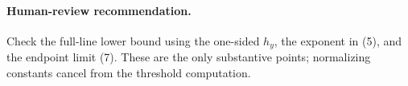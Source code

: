 \documentclass[10pt]{article}
\begin{document}
\paragraph{Human-review recommendation.}
Check the full-line lower bound using the one-sided $h_y$, the exponent in
(5), and the endpoint limit (7).  These are the only substantive points;
normalizing constants cancel from the threshold computation.
\end{document}

